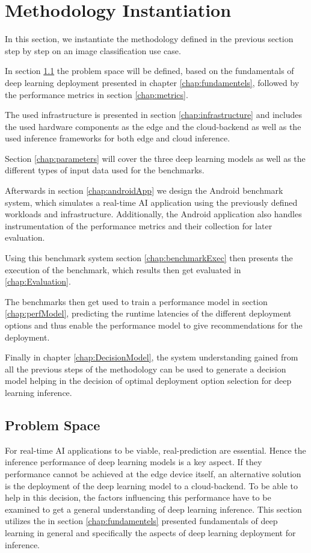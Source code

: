 \chapter{Methodology Instantiation}
\label{chap:experiments}
In this section, we instantiate the methodology defined in the previous section step by step on an image classification use case.

In section \ref{chap:problemSpace} the problem space will be defined, based on the fundamentals of deep learning deployment presented in chapter \ref{chap:fundamentels}, followed by the performance metrics in section \ref{chap:metrics}.


The used infrastructure is presented in section \ref{chap:infrastructure} and includes the used hardware components as the edge and the cloud-backend as well as the used inference frameworks for both edge and cloud inference.

Section \ref{chap:parameters} will cover the three deep learning models as well as the different types of input data used for the benchmarks.

Afterwards in section \ref{chap:androidApp} we design the Android benchmark system, which simulates a real-time AI application using the previously defined workloads and infrastructure. Additionally, the Android application also handles instrumentation of the performance metrics and their collection for later evaluation.

Using this benchmark system section \ref{chap:benchmarkExec} then presents the execution of the benchmark, which results then get evaluated in \ref{chap:Evaluation}.

The benchmarks then get used to train a performance model in section \ref{chap:perfModel}, predicting the runtime latencies of the different deployment options and thus enable the performance model to give recommendations for the deployment.

Finally in chapter \ref{chap:DecisionModel}, the system understanding gained from all the previous steps of the methodology can be used to generate a decision model helping in the decision of optimal deployment option selection for deep learning inference.


\section{Problem Space}
\label{chap:problemSpace}
For real-time AI applications to be viable, real-prediction are essential. Hence the inference performance of deep learning models is a key aspect.
If they performance cannot be achieved at the edge device itself, an alternative solution is the deployment of the deep learning model to a cloud-backend.
To be able to help in this decision, the factors influencing this performance have to be examined to get a general understanding of deep learning inference.
This section utilizes the in section \ref{chap:fundamentels} presented fundamentals of deep learning in general and specifically the aspects of deep learning deployment for inference.

